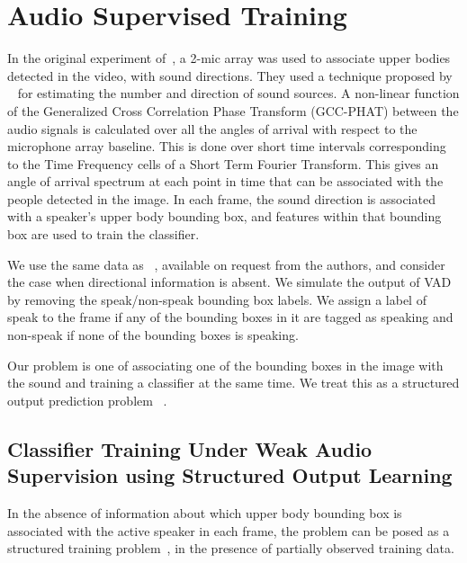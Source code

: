 \documentclass[runningheads]{llncs}
\begin{document}
\section{Audio Supervised Training}
\label{audioTraining}


In the original experiment of~\cite{Chakravarty15}, a 2-mic array was used to associate upper bodies detected in the video, with sound directions.
They used a technique proposed by ~\cite{Sayeh14} for estimating the number and direction of sound sources. A non-linear function of the Generalized Cross Correlation Phase Transform (GCC-PHAT) between the audio signals is calculated over all the angles of arrival with respect to the microphone array baseline. This is done over short time intervals corresponding to the Time Frequency cells of a Short Term Fourier Transform. This gives an angle of arrival spectrum at each point in time that can be associated with the people detected in the image.
In each frame, the sound direction is associated with a speaker's upper body bounding box, and features within that bounding box are used to train the classifier.

We use the same data as ~\cite{Chakravarty15}, available on request from the authors, and consider the case when directional information is absent. We simulate the output of VAD by removing the speak/non-speak bounding box labels. We assign a label of speak to the frame if any of the bounding boxes in it are tagged as speaking and non-speak if none of the bounding boxes is speaking.

Our problem is one of associating one of the bounding boxes in the image with the sound and training a classifier at the same time.
We treat this  as a structured output prediction problem ~\cite{Pletscher10}.


\subsection{Classifier Training Under Weak Audio Supervision using Structured Output Learning}
\label{latentSVM}

In the absence of information about which upper body bounding box is associated
with the active speaker in each frame, the problem can be posed as a structured
training problem~\cite{Bilen14a,Bilen14,Bilen15,Nguyen09}, in the presence of partially observed training data. 
\end{document}
